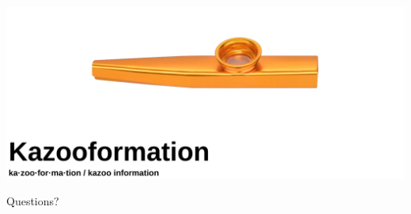 \documentclass[
	11pt, %
]{beamer}
\begin{document}
\begin{frame}
  
  \begin{center}
    \includegraphics[width=1\linewidth]{title_image.png}

    Questions?
  \end{center}


\end{frame}




\end{document}

